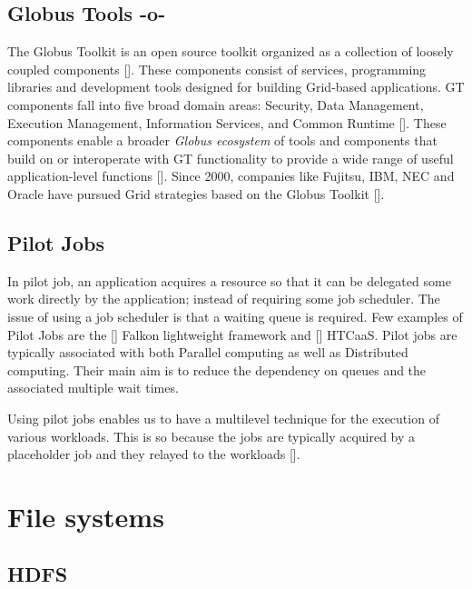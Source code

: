 \subsection{Globus Tools -o-}

The Globus Toolkit is an open source toolkit organized as a collection
of loosely coupled components [\cite{sotomayor2006globus}]. These
components consist of services, programming libraries and development
tools designed for building Grid-based applications. GT components
fall into five broad domain areas: Security, Data Management,
Execution Management, Information Services, and Common
Runtime [\cite{foster2006globus}]. These components enable a broader
\textit{Globus ecosystem} of tools and components that build on or
interoperate with GT functionality to provide a wide range of useful
application-level functions [\cite{www-about-globus}]. Since 2000,
companies like Fujitsu, IBM, NEC and Oracle have pursued Grid
strategies based on the Globus Toolkit [\cite{www-about-globus}].



\subsection{Pilot Jobs}

In pilot job, an application acquires a resource so that it can be
delegated some work directly by the application; instead of requiring
some job scheduler. The issue of using a job scheduler is that a
waiting queue is required. Few examples of Pilot Jobs are
the [\cite{pilot-job-falkon-paper-2007}] Falkon lightweight framework
and [\cite{pilot-job-htcaas-paper-2007}] HTCaaS. Pilot jobs are
typically associated with both Parallel computing as well as
Distributed computing. Their main aim is to reduce the dependency on
queues and the associated multiple wait times.

Using pilot jobs enables us to have a multilevel technique for the
execution of various workloads. This is so because the jobs are
typically acquired by a placeholder job and they relayed to the
workloads [\cite{www-pilot-job-paper-2016}].

\section{File systems}


\subsection{HDFS}
     
